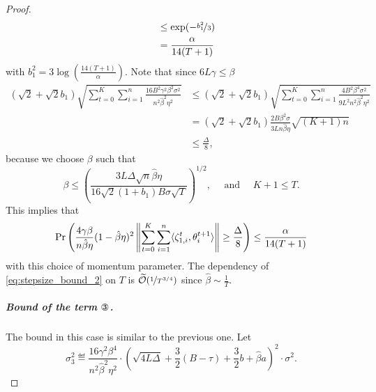 \documentclass[a4paper,11pt]{article}
\begin{document}
\begin{proof}
\begin{align*}
    & \quad \le \exp(-\nicefrac{b_1^2}{3}) \\
    &\quad = \frac{\alpha}{14(T+1)}
    \end{align*}
    with $b_1^2 = 3\log\left(\frac{14(T+1)}{\alpha}\right)$.  Note that since $6L\gamma\le \beta$
    \begin{align*}
    (\sqrt{2} + \sqrt{2}b_1)\sqrt{\sum_{t=0}^K\sum_{i=1}^n\frac{16B^2\gamma^2\beta^2\sigma^2}{n^2\hat{\beta}^2\eta^2}} 
    &\le (\sqrt{2} + \sqrt{2}b_1)\sqrt{\sum_{t=0}^K\sum_{i=1}^n\frac{4B^2\beta^{4}\sigma^2}{9L^2n^2\hat{\beta}^2\eta^2}} \\
    &= (\sqrt{2} + \sqrt{2}b_1)\frac{2B\beta^{2} \sigma}{3Ln\hat{\beta}\eta}\sqrt{(K+1)n}\\
    & \le \frac{\Delta}{8},
    \end{align*}
    because we choose $\beta$ such that 
    \begin{equation}\label{eq:stepsize_bound_2}
        \beta \le \left(\frac{3L\Delta\sqrt{n}\hat{\beta}\eta}{16\sqrt{2}(1+b_1)B\sigma\sqrt{T}}\right)^{1/2}, \quad \text{ and } \quad K+1 \le T.
    \end{equation}
    This implies that 
    \[
    \Pr\left(\frac{4\gamma\beta}{n\hat{\beta}\eta}(1-\hat{\beta}\eta)^2\left\|\sum_{t=0}^K\sum_{i=1}^n\<\zeta_{1,i}^t,\theta^{t+1}_i>\right\| \ge \frac{\Delta}{8}\right) \le \frac{\alpha}{14(T+1)}
    \]
    with this choice of momentum parameter. The dependency of \eqref{eq:stepsize_bound_2} on $T$ is $\widetilde{\mathcal O}(\nicefrac{1}{T^{3/4}})$ since $\hat{\beta} \sim \frac{1}{T}.$

    
    
    \subparagraph{Bound of the term $\circledThree$.} The bound in this case is similar to the previous one. Let 
    \[
    \sigma_3^2 \eqdef \frac{16\gamma^2\beta^4}{n^2\hat{\beta}^2\eta^2}\cdot \left(\sqrt{4L\Delta} + \frac{3}{2}(B-\tau) + \frac{3}{2}b +  \hat{\beta}a\right)^2\cdot \sigma^2.
    \]
    

\end{proof}
\end{document}

